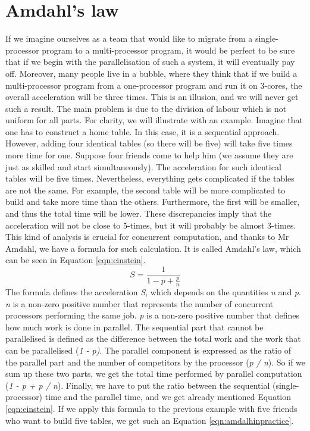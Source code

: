 \section{Amdahl's law}
\label{04:amdalhlaw}

If we imagine ourselves as a team that would like to migrate from a single-processor program to a multi-processor program, it would be perfect to be sure that if we begin with the parallelisation of such a system, it will eventually pay off. Moreover, many people live in a bubble, where they think that if we build a multi-processor program from a one-processor program and run it on 3-cores, the overall acceleration will be three times. This is an illusion, and we will never get such a result. The main problem is due to the division of labour which is not uniform for all parts. For clarity, we will illustrate with an example. Imagine that one has to construct a home table. In this case, it is a sequential approach. However, adding four identical tables (so there will be five) will take five times more time for one. Suppose four friends come to help him (we assume they are just as skilled and start simultaneously). The acceleration for such identical tables will be five times. Nevertheless, everything gets complicated if the tables are not the same. For example, the second table will be more complicated to build and take more time than the others. Furthermore, the first will be smaller, and thus the total time will be lower. These discrepancies imply that the acceleration will not be close to 5-times, but it will probably be almost 3-times. This kind of analysis is crucial for concurrent computation, and thanks to Mr Amdahl, we have a formula for such calculation. It is called Amdahl's law, which can be seen in Equation \eqref{eqn:einstein}.
\begin{equation}
    \label{eqn:einstein}
    S = \frac{1}{1 - p + \frac{p}{n}}
    \tag{1}
\end{equation}
The formula defines the acceleration \emph{S}, which depends on the quantities \emph{n} and \emph{p}. \emph{n} is a non-zero positive number that represents the number of concurrent processors performing the same job. \emph{p} is a non-zero positive number that defines how much work is done in parallel. The sequential part that cannot be parallelised is defined as the difference between the total work and the work that can be parallelised (\emph{1 - p)}. The parallel component is expressed as the ratio of the parallel part and the number of competitors by the processor (\emph{p / n}). So if we sum up these two parts, we get the total time performed by parallel computation (\emph{1 - p + p / n}). Finally, we have to put the ratio between the sequential (single-processor) time and the parallel time, and we get already mentioned Equation \ref{eqn:einstein}. If we apply this formula to the previous example with five friends who want to build five tables, we get such an Equation \eqref{eqn:amdalhinpractice}.

